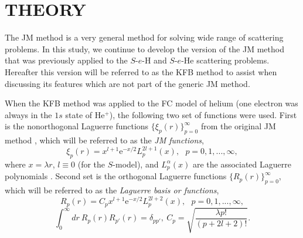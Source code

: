 \documentclass[aip
, pra
, showpacs
, aps
, twocolumn
, groupedaddress
, floatfix
]{revtex4}
\newcommand{\beq}{\begin{equation}}
\newcommand{\eeq}{\end{equation}}
\begin{document}
\begin{table}[htb]
\begin{ruledtabular}
\begin{tabular}{rlll}




\end{tabular}
\end{ruledtabular}
\end{table}



\section{THEORY}

The JM method \cite{HY74p1201,BR76p1491} is a very general method for solving wide range of scattering problems. 
In this study, we continue to develop the version of the JM method that
was previously applied to the $S$-$e$-H \cite{KB10p022708}  and $S$-$e$-He \cite{KFB11} scattering problems.
Hereafter this version will be referred to as the KFB method to assist when discussing its features which are not part of the generic JM method.

When the KFB method was applied to the FC model of helium \cite{KFB11} (one electron was always in the $1s$ state of He$^+$), 
the following two set of functions were used.
First is the nonorthogonal Laguerre functions $\{\xi_p(r)\}_{p=0}^\infty$ from the original JM method \cite{HY74p1201,BR76p1491}, which
will be referred to as the {\em JM functions},
\beq
\xi_p(r) = x^{l+1} \mbox{e}^{-x /2}
L_p^{2l+1}(x), \ \ \ p = 0, 1, ..., \infty,
\eeq
where $x=\lambda r$, $l \equiv 0$ (for the $S$-model), and $L_p^{\alpha}(x)$ are the associated Laguerre polynomials \cite{abramowitz}.
Second set is the orthogonal Laguerre functions $\{R_p(r)\}_{p=0}^\infty$, which
will be referred to as the {\em Laguerre basis or functions},
\beq
R_p(r) = C_p x^{l+1} \mbox{e}^{-x /2}
L_p^{2l+2}(x), \ \ \ p = 0, 1, ..., \infty,
\eeq
\beq
\int_0^\infty dr \ R_p(r) R_{p'}(r) = \delta_{pp'}, \ C_p= \sqrt{\frac{\lambda p!}{ (p+2l+2)!}}.
\eeq
\end{document}
